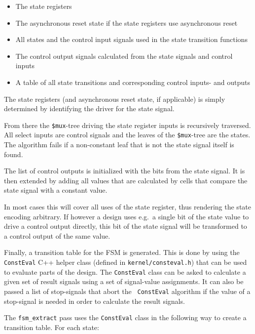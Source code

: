 \begin{itemize}
\item The state registers
\item The asynchronous reset state if the state registers use asynchronous reset
\item All states and the control input signals used in the state transition functions
\item The control output signals calculated from the state signals and control inputs
\item A table of all state transitions and corresponding control inputs- and outputs
\end{itemize}

The state registers (and asynchronous reset state, if applicable) is simply determined
by identifying the driver for the state signal.

From there the {\tt \$mux}-tree driving the state register inputs is
recursively traversed. All select inputs are control signals and the leaves of the
{\tt \$mux}-tree are the states. The algorithm fails if a non-constant leaf
that is not the state signal itself is found.

The list of control outputs is initialized with the bits from the state signal.
It is then extended by adding all values that are calculated by cells that
compare the state signal with a constant value.

In most cases this will cover all uses of the state register, thus rendering the
state encoding arbitrary. If however a design uses e.g.~a single bit of the state
value to drive a control output directly, this bit of the state signal will be
transformed to a control output of the same value.

Finally, a transition table for the FSM is generated. This is done by using the
{\tt ConstEval} C++ helper class (defined in {\tt kernel/consteval.h}) that can
be used to evaluate parts of the design. The {\tt ConstEval} class can be asked
to calculate a given set of result signals using a set of signal-value
assignments. It can also be passed a list of stop-signals that abort the {\tt
ConstEval} algorithm if the value of a stop-signal is needed in order to
calculate the result signals.

The {\tt fsm\_extract} pass uses the {\tt ConstEval} class in the following way
to create a transition table. For each state:

